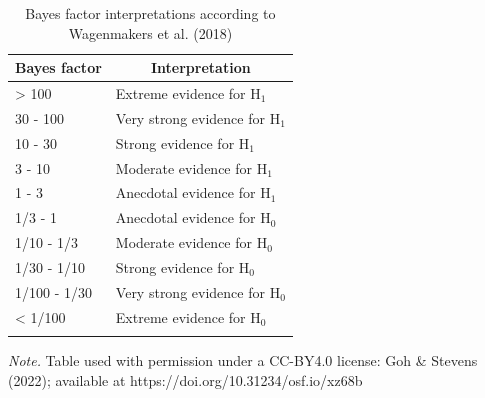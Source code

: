 \documentclass[
  doc,floatsintext]{apa6}
\begin{document}
\clearpage

\begin{table}[tbp]

\begin{center}
\begin{threeparttable}

\caption{\label{tab:unnamed-chunk-4}Bayes factor interpretations according to Wagenmakers et al. (2018)}

\begin{tabular}{ll}
\toprule
Bayes factor & \multicolumn{1}{c}{Interpretation}\\
\midrule
> 100 & Extreme evidence for H$_{1}$\\
30 - 100 & Very strong evidence for H$_{1}$\\
10 - 30 & Strong evidence for H$_{1}$\\
3 - 10 & Moderate evidence for H$_{1}$\\
1 - 3 & Anecdotal evidence for H$_{1}$\\
1/3 - 1 & Anecdotal evidence for H$_{0}$\\
1/10 - 1/3 & Moderate evidence for H$_{0}$\\
1/30 - 1/10 & Strong evidence for H$_{0}$\\
1/100 - 1/30 & Very strong evidence for H$_{0}$\\
< 1/100 & Extreme evidence for H$_{0}$\\
\bottomrule
\addlinespace
\end{tabular}

\begin{tablenotes}[para]
\normalsize{\textit{Note.} Table used with permission under a CC-BY4.0 license: Goh \& Stevens (2022); available at https://doi.org/10.31234/osf.io/xz68b}
\end{tablenotes}

\end{threeparttable}
\end{center}

\end{table}

\clearpage
\end{document}
